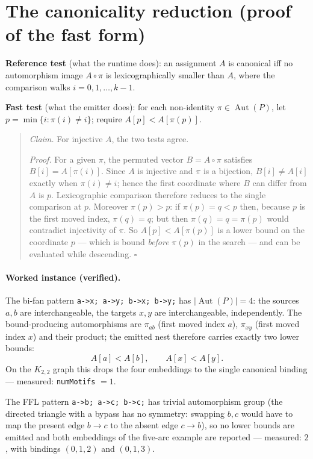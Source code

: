 \documentclass[11pt,a4paper]{article}
\newcommand{\code}[1]{\texttt{#1}}
\newcommand{\Aut}{\operatorname{Aut}}
\begin{document}
\section{The canonicality reduction (proof of the fast form)}

\textbf{Reference test} (what the runtime does): an assignment $A$ is canonical
iff no automorphism image $A\circ\pi$ is lexicographically smaller than $A$,
where the comparison walks $i=0,1,\dots,k-1$.

\textbf{Fast test} (what the emitter does): for each non-identity
$\pi\in\Aut(P)$, let $p=\min\{i:\pi(i)\ne i\}$; require $A[p] < A[\pi(p)]$.

\begin{quote}
\emph{Claim.} For injective $A$, the two tests agree.

\emph{Proof.} For a given $\pi$, the permuted vector $B=A\circ\pi$ satisfies
$B[i]=A[\pi(i)]$. Since $A$ is injective and $\pi$ is a bijection,
$B[i]\ne A[i]$ exactly when $\pi(i)\ne i$; hence the first coordinate where $B$
can differ from $A$ is $p$. Lexicographic comparison therefore reduces to the
single comparison at $p$. Moreover $\pi(p)>p$: if $\pi(p)=q<p$ then, because
$p$ is the first moved index, $\pi(q)=q$; but then $\pi(q)=q=\pi(p)$ would
contradict injectivity of $\pi$. So $A[p]<A[\pi(p)]$ is a lower bound on the
coordinate $p$ --- which is bound \emph{before} $\pi(p)$ in the search --- and can
be evaluated while descending. \hfill$\square$
\end{quote}

\paragraph{Worked instance (verified).} The bi-fan pattern
\code{a->x; a->y; b->x; b->y;} has $|\Aut(P)|=4$: the sources $a,b$ are
interchangeable, the targets $x,y$ are interchangeable, independently. The
bound-producing automorphisms are $\pi_{ab}$ (first moved index $a$), $\pi_{xy}$
(first moved index $x$) and their product; the emitted nest therefore carries
exactly two lower bounds:
\[
  A[a] < A[b], \qquad A[x] < A[y].
\]
On the $K_{2,2}$ graph this drops the four embeddings to the single canonical
binding --- measured: \code{numMotifs} $=1$.

The FFL pattern \code{a->b; a->c; b->c;} has trivial automorphism group (the
directed triangle with a bypass has no symmetry: swapping $b,c$ would have to map
the present edge $b\to c$ to the absent edge $c\to b$), so no lower bounds are
emitted and both embeddings of the five-arc example are reported --- measured:
$2$, with bindings $(0,1,2)$ and $(0,1,3)$.
\end{document}
